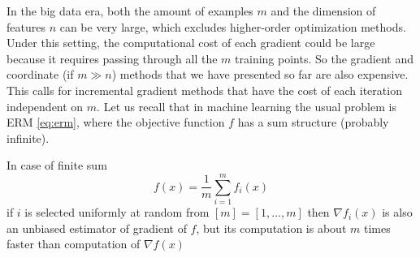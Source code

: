 In the big data era, both the amount of examples $m$ and the dimension of features $n$ can be very large, which excludes higher-order optimization methods. Under this setting, the computational cost of each gradient could be large because it requires passing through all the $m$ training points. So the gradient and coordinate (if $m\gg n$)  methods that we have presented so far are also expensive. This calls for incremental gradient methods that have the cost of each iteration independent on $m$. Let us recall that in machine learning the usual problem is ERM \eqref{eq:erm}, where the objective function $f$ has a sum structure (probably infinite).

In case of finite sum
$$
f(x) = \frac{1}{m}\sum_{i=1}^m f_i(x)
$$
if $i$ is selected uniformly at random from $[m] = [1,\dots,m]$ then $\nabla f_i(x)$ is also an unbiased estimator of gradient of $f$, but its computation is about $m$ times faster than computation of $\nabla f(x)$

